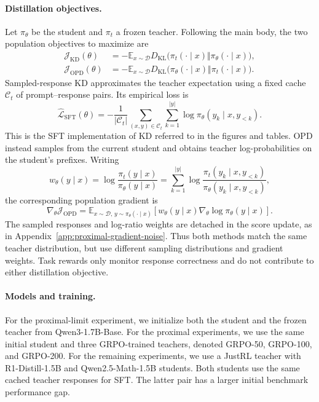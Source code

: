 \paragraph{Distillation objectives.}
Let $\pi_\theta$ be the student and $\pi_t$ a frozen teacher. Following
the main body, the two population objectives to maximize are
\begin{align}
 \mathcal J_{\mathrm{KD}}(\theta)
 &=-\mathbb E_{x\sim\mathcal D}
 D_{\mathrm{KL}}\bigl(\pi_t(\cdot\mid x)\Vert
                       \pi_\theta(\cdot\mid x)\bigr),
 \label{eq:app-distillation-kd}\\
 \mathcal J_{\mathrm{OPD}}(\theta)
 &=-\mathbb E_{x\sim\mathcal D}
 D_{\mathrm{KL}}\bigl(\pi_\theta(\cdot\mid x)\Vert
                       \pi_t(\cdot\mid x)\bigr).
 \label{eq:app-distillation-opd}
\end{align}
Sampled-response KD approximates the teacher expectation using a fixed
cache $\mathcal C_t$ of prompt--response pairs. Its empirical loss is
\begin{equation}
 \widehat{\mathcal L}_{\mathrm{SFT}}(\theta)
 =-\frac{1}{|\mathcal C_t|}\sum_{(x,y)\in\mathcal C_t}
   \sum_{k=1}^{|y|}\log\pi_\theta(y_k\mid x,y_{<k}).
 \label{eq:app-distillation-sft-loss}
\end{equation}
This is the SFT implementation of KD referred to in the figures and
tables. OPD instead samples from the current student and obtains
teacher log-probabilities on the student's prefixes. Writing
\begin{equation}
 w_\theta(y\mid x)
 =\log\frac{\pi_t(y\mid x)}{\pi_\theta(y\mid x)}
 =\sum_{k=1}^{|y|}\log
   \frac{\pi_t(y_k\mid x,y_{<k})}{\pi_\theta(y_k\mid x,y_{<k})},
 \label{eq:app-distillation-log-ratio}
\end{equation}
the corresponding population gradient is
\begin{equation}
 \nabla_\theta\mathcal J_{\mathrm{OPD}}
 =\mathbb E_{x\sim\mathcal D,\,y\sim\pi_\theta(\cdot\mid x)}
 \left[w_\theta(y\mid x)\nabla_\theta\log\pi_\theta(y\mid x)\right].
 \label{eq:app-distillation-opd-gradient}
\end{equation}
The sampled responses and log-ratio weights are detached in the score
update, as in Appendix~\ref{app:proximal-gradient-noise}. Thus both
methods match the same teacher distribution, but use different sampling
distributions and gradient weights. Task rewards only monitor response
correctness and do not contribute to either distillation objective.

\paragraph{Models and training.}
For the proximal-limit experiment, we initialize both the student and
the frozen teacher from Qwen3-1.7B-Base. For the proximal experiments,
we use the same initial student and three GRPO-trained teachers,
denoted GRPO-50, GRPO-100, and GRPO-200. For the remaining experiments,
we use a JustRL teacher with R1-Distill-1.5B and Qwen2.5-Math-1.5B
students. Both students use the same cached teacher responses for SFT.
The latter pair has a larger initial benchmark performance gap.

